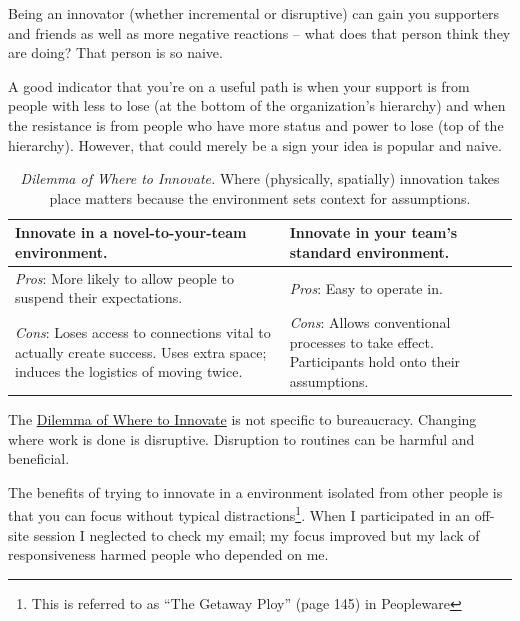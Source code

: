 Being an innovator (whether incremental or disruptive) can gain you supporters and friends as well as more negative reactions -- what does that person think they are doing? That person is so naive.

A good indicator that you're on a useful path is when your support is from people with less to lose (at the bottom of the organization's hierarchy) and when the resistance is from people who have more status and power to lose (top of the hierarchy). However, that could merely be a sign your idea is popular and naive. 




\begin{center}
\begin{table}[H] %
\begin{tabular}{ | m{\dilemmatablewidth}| m{\dilemmatablewidth} | } 
  \hline
  \textbf{Innovate in a novel-to-your-team environment.} &
  \textbf{Innovate in your team's standard environment.} \\
  \hline
  \textit{Pros}: More likely to allow people to suspend their expectations.  & 
  \textit{Pros}: Easy to operate in. \\
  \hline
  \textit{Cons}: Loses access to connections vital to actually create success. Uses extra space; induces the logistics of moving twice. & 
  \textit{Cons}: Allows conventional processes to take effect. Participants hold onto their assumptions. \\
  \hline
\end{tabular}
\caption{
\textit{Dilemma of Where to Innovate.}
Where (physically, spatially) innovation takes place matters because the environment sets context for assumptions.
}
\label{table:where-to-innovate}
\end{table}
\end{center}

The \href{table:where-to-innovate}{Dilemma of Where to Innovate} is not specific to bureaucracy. Changing where work is done is disruptive. Disruption to routines can be harmful and beneficial.

The benefits of trying to innovate in a environment isolated from other people is that you can focus without typical distractions\footnote{This is referred to as ``The Getaway Ploy'' (page 145) in Peopleware\cite{1987_DeMarco}}. When I participated in an off-site session I neglected to check my email; my focus improved but my lack of responsiveness harmed people who depended on me.


